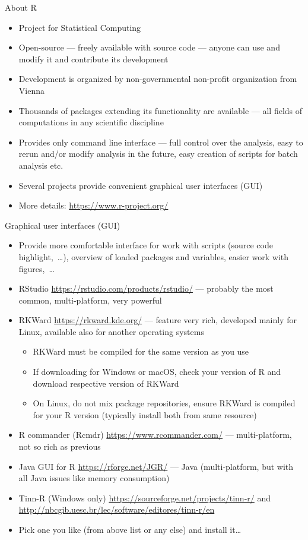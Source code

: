 \documentclass[compress, ucs, xelatex, 11pt, xcolor=svgnames, aspectratio=169,
	hyperref={
		bookmarks=true,
		unicode=true,
		colorlinks=true,
		pdftitle={Molecular data in R},
		plainpages=false,
		pdfauthor={Vojtech Zeisek},
		pdfsubject={Course about phylogeny and evolution in R},
		pdfcreator={XeLaTeX},
		pdfkeywords={R, evolution, phylogeny, molecular data},
		linkcolor=Crimson, %
		anchorcolor=Magenta, %
		citecolor=Magenta, %
		filecolor=Magenta, %
		menucolor=Magenta, %
		urlcolor=DodgerBlue, %
		pdftex},
	url={hyphens, lowtilde} %
	]{beamer}
\begin{document}
\begin{frame}{About R}
	\begin{itemize}
		\item Project for Statistical Computing
		\item Open-source --- freely available with source code --- anyone can use and modify it and contribute its development
		\item Development is organized by non-governmental non-profit organization from Vienna
		\item Thousands of packages extending its functionality are available --- all fields of computations in any scientific discipline
		\item Provides only command line interface --- full control over the analysis, easy to rerun and/or modify analysis in the future, easy creation of scripts for batch analysis etc.
		\item Several projects provide convenient graphical user interfaces (GUI)
		\item More details: \url{https://www.r-project.org/}
	\end{itemize}
\end{frame}

\begin{frame}[allowframebreaks]{Graphical user interfaces (GUI)}
	\label{gui}
	\begin{itemize}
		\item Provide more comfortable interface for work with scripts (source code highlight,~\ldots), overview of loaded packages and variables, easier work with figures,~\ldots
		\item RStudio \url{https://rstudio.com/products/rstudio/} --- probably the most common, multi-platform, very powerful
		\item RKWard \url{https://rkward.kde.org/} --- feature very rich, developed mainly for Linux, available also for another operating systems
		\begin{itemize}
			\item RKWard must be compiled for the same version as you use
			\item If downloading for Windows or macOS, check your version of R and download respective version of RKWard
			\item On Linux, do not mix package repositories, ensure RKWard is compiled for your R version (typically install both from same resource)
		\end{itemize}
		\item R commander (Rcmdr) \url{https://www.rcommander.com/} --- multi-platform, not so rich as previous
		\item Java GUI for R \url{https://rforge.net/JGR/} --- Java (multi-platform, but with all Java issues like memory consumption)
		\item Tinn-R (Windows only) \url{https://sourceforge.net/projects/tinn-r/} and \url{http://nbcgib.uesc.br/lec/software/editores/tinn-r/en}
		\item Pick one you like (from above list or any else) and install it\ldots
	\end{itemize}
\end{frame}
\end{document}
